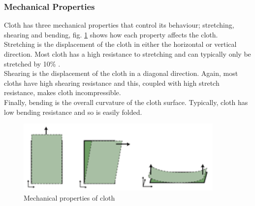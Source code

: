 \subsubsection{Mechanical Properties}
Cloth has three mechanical properties that control its behaviour; stretching, shearing and bending, fig. \ref{fig:mechanical properties} shows how each property affects the cloth.
\\Stretching is the displacement of the cloth in either the horizontal or vertical direction. Most cloth has a high resistance to stretching and can typically only be stretched by 10\% \parencites[1]{Yalcn}[4]{Provot2001}.
\\Shearing is the displacement of the cloth in a diagonal direction. Again, most cloths have high shearing resistance and this, coupled with high stretch resistance, makes cloth incompressible.
\\Finally, bending is the overall curvature of the cloth surface. Typically, cloth has low bending resistance and so is easily folded.
\begin{figure}[tp]
   \begin{center}
     \includegraphics{Figures/mechanical_properties}
   \end{center}
   \caption[Mechanical properties of cloth]{Mechanical properties of cloth \parencite[1]{Yalcn}}
   \label{fig:mechanical properties}
\end{figure}

